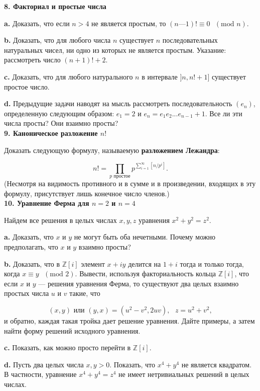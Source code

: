 \documentclass{mai_book}
\begin{document}
\noindent \textbf{8. Факториал и простые числа}

\textbf{a.} Доказать, что если $n > 4$ не является простым, то $(n — 1)! \equiv 0 \text{ } (\text{mod } n)$.

\textbf{b.} Доказать, что для любого числа $n$ существует $n$ 
последовательных натуральных чисел, ни одно из которых не является простым. 
Указание: рассмотреть число $(n + 1)! + 2$.

\textbf{c.} Доказать, что для любого натурального $n$ в интервале $]n, n! + 1]$ существует простое число.

\textbf{d.} Предыдущие задачи наводят на мысль рассмотреть 
последовательность $(e_n)$, определенную следующим образом: $e_1 = 2$ и
$e_n = e_1e_2...e_{n-1}+1$. Все ли эти числа просты? Они взаимно просты?
\\

\noindent \textbf{9. Каноническое разложение $n!$}

Доказать следующую формулу, называемую \textbf{разложением Лежандра}:

\[
n! = \prod_{p \text{ простое}} p^{\sum_{i=1}^\infty[n/p^i]}.
\]
(Несмотря на видимость противного и в сумме и в произведении, 
входящих в эту формулу, присутствует лишь конечное число членов.)
\\

\noindent \textbf{10. Уравнение Ферма для $n = 2$ и $n = 4$}

Найдем все решения в целых числах $x, y, z$ уравнения $x^2 + y^2 = z^2$.

\textbf{a.} Доказать, что $x$ и $y$ не могут быть оба нечетными. Почему можно
предполагать, что $x$ и $y$ взаимно просты?

\textbf{b.} Доказать, что в $\mathbb{Z}[i]$ элемент $x + iy$ делится на $1 + i$ тогда и только тогда, когда $x \equiv y \text{ } (\text{mod } 2)$. Вывести, используя факториальность кольца $\mathbb{Z}[i]$, что если $x$ и $y$ — решения уравнения Ферма, то существуют два целых взаимно простых числа $u$ и $v$ такие, что

\[
(x,y) \text{ или } (y,x) = (u^2-v^2, 2uv), \text{ } z=u^2+v^2,
\]
и обратно, каждая такая тройка дает решение уравнения. Дайте 
примеры, а затем найти форму решений исходного уравнения.

\textbf{c.} Показать, как можно просто перейти в $\mathbb{Z}[i]$.

\textbf{d.} Пусть два целых числа $x, y > 0$. Показать, что $x^4 + y^4$ не является квадратом. В частности, уравнение $x^4 + y^4 = z^4$ не имеет 
нетривиальных решений в целых числах.
\\
\end{document}
